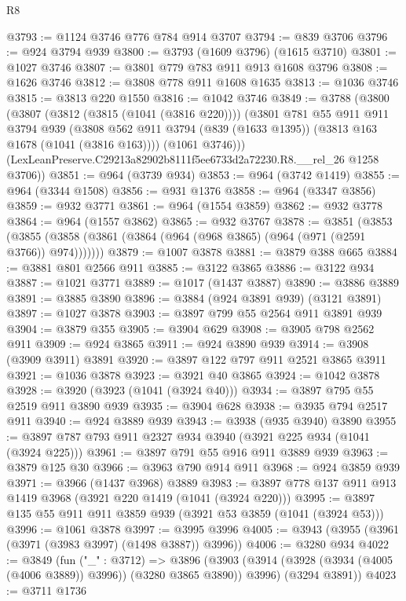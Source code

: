 \begin{lexlean}{R8}
\begin{coremodule}
@3793 := @1124 @3746 @776 @784 @914 @3707
@3794 := @839 @3706
@3796 := @924 @3794 @939
@3800 := @3793 (@1609 @3796) (@1615 @3710)
@3801 := @1027 @3746
@3807 := @3801 @779 @783 @911 @913 @1608 @3796
@3808 := @1626 @3746
@3812 := @3808 @778 @911 @1608 @1635
@3813 := @1036 @3746
@3815 := @3813 @220 @1550
@3816 := @1042 @3746
@3849 := @3788
    (@3800
      (@3807
        (@3812 (@3815 (@1041 (@3816 @220))))
        (@3801
          @781
          @55
          @911
          @911
          @3794
          @939
          (@3808 @562 @911 @3794 (@839 (@1633 @1395)) (@3813 @163 @1678 (@1041 (@3816 @163))))
          (@1061 @3746)))
      (LexLeanPreserve.C29213a82902b8111f5ee6733d2a72230.R8.__rel_26 @1258 @3706))
@3851 := @964 (@3739 @934)
@3853 := @964 (@3742 @1419)
@3855 := @964 (@3344 @1508)
@3856 := @931 @1376
@3858 := @964 (@3347 @3856)
@3859 := @932 @3771
@3861 := @964 (@1554 @3859)
@3862 := @932 @3778
@3864 := @964 (@1557 @3862)
@3865 := @932 @3767
@3878 := @3851
    (@3853 (@3855 (@3858 (@3861 (@3864 (@964 (@968 @3865) (@964 (@971 (@2591 @3766)) @974)))))))
@3879 := @1007 @3878
@3881 := @3879 @388 @665
@3884 := @3881 @801 @2566 @911
@3885 := @3122 @3865
@3886 := @3122 @934
@3887 := @1021 @3771
@3889 := @1017 (@1437 @3887)
@3890 := @3886 @3889
@3891 := @3885 @3890
@3896 := @3884 (@924 @3891 @939) (@3121 @3891)
@3897 := @1027 @3878
@3903 := @3897 @799 @55 @2564 @911 @3891 @939
@3904 := @3879 @355
@3905 := @3904 @629
@3908 := @3905 @798 @2562 @911
@3909 := @924 @3865
@3911 := @924 @3890 @939
@3914 := @3908 (@3909 @3911) @3891
@3920 := @3897 @122 @797 @911 @2521 @3865 @3911
@3921 := @1036 @3878
@3923 := @3921 @40 @3865
@3924 := @1042 @3878
@3928 := @3920 (@3923 (@1041 (@3924 @40)))
@3934 := @3897 @795 @55 @2519 @911 @3890 @939
@3935 := @3904 @628
@3938 := @3935 @794 @2517 @911
@3940 := @924 @3889 @939
@3943 := @3938 (@935 @3940) @3890
@3955 := @3897 @787 @793 @911 @2327 @934 @3940 (@3921 @225 @934 (@1041 (@3924 @225)))
@3961 := @3897 @791 @55 @916 @911 @3889 @939
@3963 := @3879 @125 @30
@3966 := @3963 @790 @914 @911
@3968 := @924 @3859 @939
@3971 := @3966 (@1437 @3968) @3889
@3983 := @3897 @778 @137 @911 @913 @1419 @3968 (@3921 @220 @1419 (@1041 (@3924 @220)))
@3995 := @3897 @135 @55 @911 @911 @3859 @939 (@3921 @53 @3859 (@1041 (@3924 @53)))
@3996 := @1061 @3878
@3997 := @3995 @3996
@4005 := @3943 (@3955 (@3961 (@3971 (@3983 @3997) (@1498 @3887)) @3996))
@4006 := @3280 @934
@4022 := @3849
    (fun ("_" : @3712) =>
    @3896
      (@3903 (@3914 (@3928 (@3934 (@4005 (@4006 @3889)) @3996)) (@3280 @3865 @3890)) @3996)
      (@3294 @3891))
@4023 := @3711 @1736

\end{coremodule}
\end{lexlean}
